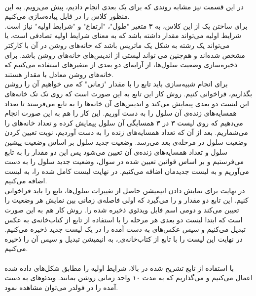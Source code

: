 \documentclass[11pt, a4paper]{article}
\begin{document}
\paragraph{}
در این قسمت نیز مشابه روندی که برای  یک بعدی انجام دادیم، پیش می‌رویم. به این منظور کلاس  را در فایل  پیاد‌ه‌سازی می‌کنیم.\\
برای ساختن یک  از این کلاس، به ۳ متغیر "طول"، "ارتفاع" و "شرایط اولیه" نیاز است. شرایط اولیه می‌تواند مقدار  داشته باشد که به معنای شرایط اولیه تصادفی است، یا می‌تواند یک رشته به شکل یک ماتریس باشد که خانه‌های روشن در آن با کارکتر  مشخص شده‌اند و هم‌چنین می تواند لیستی از اندیس‌های خانه‌های روشن باشد. برای ذخیره‌سازی وضعیت سلول‌ها، از آرایه‌ای دو بعدی از متغیرهای  استفاده می‌کنیم که خانه‌های روشن معادل با مقدار  هستند.\\
برای انجام شبیه‌سازی باید تابع  را با مقدار "زمانی" که می خواهیم آن را روشن بگذاریم، فراخوانی کنیم. روش کار این تابع به این صورت است که روی تک تک خانه‌های این لیست دو بعدی پیمایش می‌‌کند و اندیس‌های آن خانه‌ها را به تابع  می‌فرستد تا تعداد همسایه‌های زنده‌ی آن سلول را به دست آوریم. این کار را هم به این صورت انجام می‌دهیم که روی لیست ۳ در ۳ همسایگی آن سلول پیمایش کرده و تعداد خانه‌های  را می‌شماریم. بعد از آن که تعداد همسایه‌های زنده را به دست آوردیم، نوبت تعیین کردن وضعیت سلول در مرحله‌ی بعد می‌رسد. وضعیت جدید سلول بر اساس وضعیت پیشین سلول و تعداد همسایه‌های زنده‌ی آن تعیین می‌شود پس این دو مقدار را به تابع  می‌فرستیم و بر اساس قوانین تعیین شده در سوال، وضعیت جدید سلول را به دست می‌‌‌‌آوریم و به لیست جدیدمان اضافه می‌کنیم. در نهایت لیست کامل شده را، به لیست  اضافه می‌کنیم.\\
در نهایت برای نمایش دادن انیمیشن حاصل از تغییرات سلول‌ها، تابع  را باید فراخوانی کنیم. این تابع دو مقدار  و  را می‌گیرد که اولی فاصله‌ی زمانی بین نمایش هر وضعیت را تعیین می‌کند و دومی اسم فایل ویدئوي ذخیره شده را. روش کار هم به این صورت است که ابتدا لیست دو بعدی هر مرحله را با استفاده از تابع  از کتاب‌خانه‌ی  به عکس تبدیل می‌کنیم و سپس عکس‌های به دست آمده را در یک لیست جدید ذخیره می‌کنیم. در نهایت این لیست را با تابع  از کتاب‌خانه‌ی ِ، به انیمیشن تبدیل و سپس آن را ذخیره می‌کنیم.

\paragraph{}
با استفاده از تابع تشریح شده در بالا، شرایط اولیه را مطابق شکل‌های داده شده اعمال می‌کنیم و می‌گذاریم که به مدت ۱۰ واحد زمانی روشن بمانند. ویدئو‌های به دست آمده را در فولدر  می‌توان مشاهده نمود.
\end{document}
